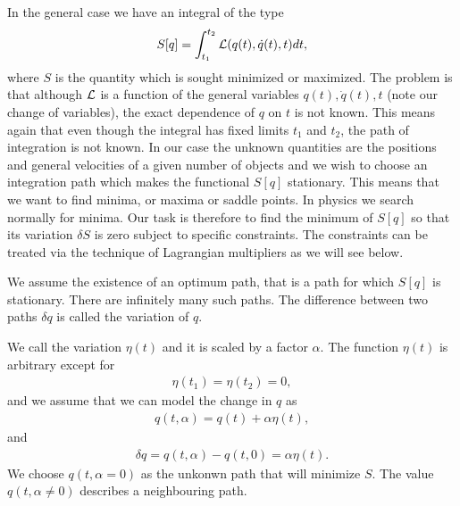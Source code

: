 \documentclass[letterpaper,10pt,english]{sphinxmanual}
\begin{document}
In the general case we have an integral of the type
\begin{equation*}
\begin{split}
S[q]= \int_{t_1}^{t_2} {\cal L}(q(t),\dot{q}(t),t)dt,
\end{split}
\end{equation*}
where \(S\) is the quantity which is sought minimized or maximized.  The
problem is that although \({\cal L}\)  is a function of the general variables
\(q(t),\dot{q}(t),t\) (note our change of variables), the exact dependence of \(q\) on \(t\) is not known.
This means again that even though the integral has fixed limits \(t_1\)
and \(t_2\), the path of integration is not known. In our case the unknown
quantities are the positions and general velocities of a given number
of objects and we wish to choose an integration path which makes the
functional \(S[q]\) stationary. This means that we want to find minima,
or maxima or saddle points. In physics we search normally for minima.
Our task is therefore to find the minimum of \(S[q]\) so that its
variation \(\delta S\) is zero subject to specific constraints.  The
constraints can be treated via the technique of Lagrangian multipliers
as we will see below.

We assume the existence of an optimum path, that is a path for which
\(S[q]\) is stationary. There are infinitely many such paths.  The
difference between two paths \(\delta q\) is called the variation of
\(q\).

We call the variation \(\eta(t)\) and it is scaled by a factor \(\alpha\).
The function \(\eta(t)\) is arbitrary except for
\begin{equation*}
\begin{split}
\eta(t_1)=\eta(t_2)=0,
\end{split}
\end{equation*}
and we assume that we can model the change in \(q\) as
\begin{equation*}
\begin{split}
q(t,\alpha) = q(t)+\alpha\eta(t),
\end{split}
\end{equation*}
and
\begin{equation*}
\begin{split}
\delta q = q(t,\alpha) -q(t,0)=\alpha\eta(t).
\end{split}
\end{equation*}
We choose \(q(t,\alpha=0)\) as the unkonwn path  that will minimize \(S\).  The value
\(q(t,\alpha\ne 0)\)  describes a neighbouring path.
\end{document}

